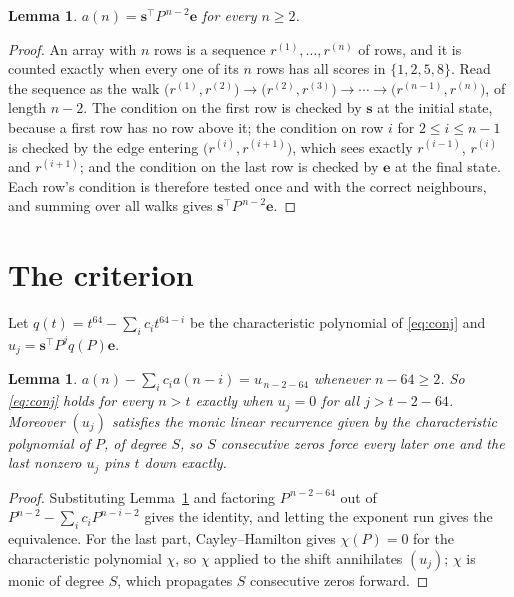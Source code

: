 \documentclass[11pt,a4paper]{article}
\theoremstyle{plain}
\newtheorem{lemma}[theorem]{Lemma}
\theoremstyle{definition}
\begin{document}
\begin{lemma}\label{lem:walk}
$a(n)=\mathbf{s}^{\!\top}P^{\,n-2}\mathbf{e}$ for every $n\ge2$.
\end{lemma}

\begin{proof}
An array with $n$ rows is a sequence $r^{(1)},\dots,r^{(n)}$ of rows, and it is counted
exactly when every one of its $n$ rows has all scores in $\{1,2,5,8\}$. Read the sequence as the
walk $\bigl(r^{(1)},r^{(2)}\bigr)\to\bigl(r^{(2)},r^{(3)}\bigr)\to\cdots\to
\bigl(r^{(n-1)},r^{(n)}\bigr)$, of length $n-2$. The condition on the first row is
checked by $\mathbf{s}$ at the initial state, because a first row has no row above it; the
condition on row $i$ for $2\le i\le n-1$ is checked by the edge entering
$\bigl(r^{(i)},r^{(i+1)}\bigr)$, which sees exactly $r^{(i-1)}$, $r^{(i)}$ and
$r^{(i+1)}$; and the condition on the last row is checked by $\mathbf{e}$ at the final
state. Each row's condition is therefore tested once and with the correct neighbours, and
summing over all walks gives $\mathbf{s}^{\!\top}P^{\,n-2}\mathbf{e}$.
\end{proof}

\section{The criterion}

Let $q(t)=t^{64}-\sum_i c_i t^{64-i}$ be the characteristic polynomial of
\eqref{eq:conj} and $u_j=\mathbf{s}^{\!\top}P^{j}q(P)\mathbf{e}$.

\begin{lemma}\label{lem:crit}
$a(n)-\sum_i c_i a(n-i)=u_{\,n-2-64}$ whenever $n-64\ge2$. So \eqref{eq:conj}
holds for every $n>t$ exactly when $u_j=0$ for all $j>t-2-64$. Moreover $(u_j)$
satisfies the monic linear recurrence given by the characteristic polynomial of $P$, of
degree $S$, so $S$ consecutive zeros force every later one and the last nonzero $u_j$ pins
$t$ down exactly.
\end{lemma}

\begin{proof}
Substituting Lemma~\ref{lem:walk} and factoring $P^{\,n-2-64}$ out of
$P^{n-2}-\sum_i c_i P^{n-i-2}$ gives the identity, and letting the exponent run gives the
equivalence. For the last part, Cayley--Hamilton gives $\chi(P)=0$ for the characteristic
polynomial $\chi$, so $\chi$ applied to the shift annihilates $(u_j)$; $\chi$ is monic of
degree $S$, which propagates $S$ consecutive zeros forward.
\end{proof}
\end{document}
